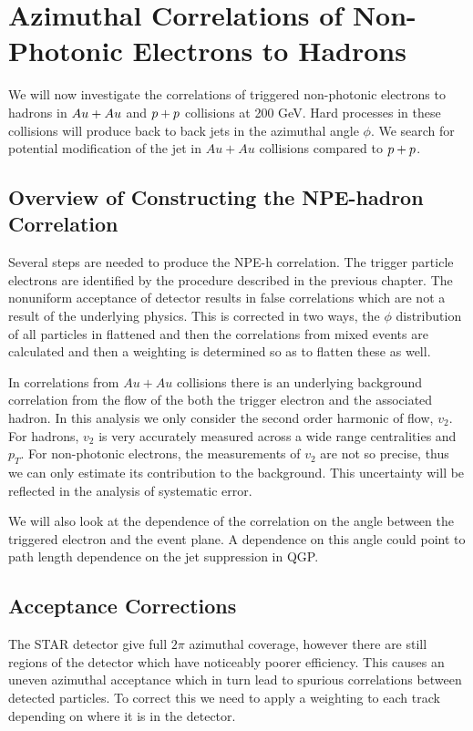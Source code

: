 \chapter{Azimuthal Correlations of Non-Photonic Electrons to Hadrons}

We will now investigate the correlations of triggered non-photonic electrons to hadrons in $Au + Au$ and $p+p$ collisions at 200 GeV. Hard processes in these collisions will produce back to back jets in the azimuthal angle $\phi$. We search for potential modification of the jet in $Au+Au$ collisions compared to $p+p$. 

\section{Overview of Constructing the NPE-hadron Correlation}

Several steps are needed to produce the NPE-h correlation. The trigger particle electrons are identified by the procedure described in the previous chapter. The nonuniform acceptance of detector results in false correlations which are not a result of the underlying physics. This is corrected in two ways, the $\phi$ distribution of all particles in flattened and then the correlations from mixed events are calculated and then a weighting is determined so as to flatten these as well.

In correlations from $Au+Au$ collisions there is an underlying background correlation from the flow of the both the trigger electron and the associated hadron. In this analysis we only consider the second order harmonic of flow, $v_{2}$. For hadrons, $v_{2}$ is very accurately measured across a wide range centralities and $p_{T}$. For non-photonic electrons, the measurements of $v_{2}$ are not so precise, thus we can only estimate its contribution to the background. This uncertainty will be reflected in the analysis of systematic error.

We will also look at the dependence of the correlation on the angle between the triggered electron and the event plane. A dependence on this angle could point to path length dependence on the jet suppression in QGP.

\section{Acceptance Corrections}

The STAR detector give full $2\pi$ azimuthal coverage, however there are still regions of the detector which have noticeably poorer efficiency. This causes an uneven azimuthal acceptance which in turn lead to spurious correlations between detected particles. To correct this we need to apply a weighting to each track depending on where it is in the detector. 

